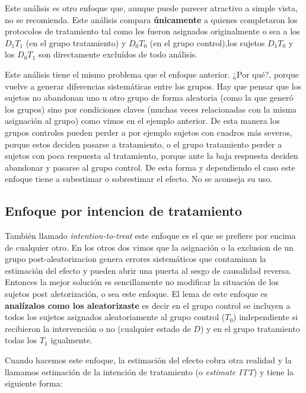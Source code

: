 \documentclass[
  letterpaper,
  DIV=11,
  numbers=noendperiod,
  oneside]{scrreprt}
\begin{document}
Este análisis es otro enfoque que, aunque puede parecer atractivo a
simple vista, no se recomienda. Este análisis compara
\textbf{únicamente} a quienes completaron los protocolos de tratamiento
tal como les fueron asignados originalmente o sea a los \(D_1 T_1\) (en
el grupo tratamiento) y \(D_0 T_0\) (en el grupo control),los sujetos
\(D_1 T_0\) y los \(D_0 T_1\) son directamente excluídos de todo
análisis.

Este análisis tiene el mismo problema que el enfoque anterior. ¿Por
qué?, porque vuelve a generar diferencias sistemáticas entre los grupos.
Hay que pensar que los sujetos no abandonan uno u otro grupo de forma
aleatoria (como la que generó los grupos) sino por condiciones claves
(muchas veces relacionadas con la misma asignación al grupo) como vimos
en el ejemplo anterior. De esta manera los grupos controles pueden
perder a por ejemplo sujetos con cuadros más severos, porque estos
deciden pasarse a tratamiento, o el grupo tratamiento perder a sujetos
con poca respuesta al tratamiento, porque ante la baja respuesta deciden
abandonar y pasarse al grupo control. De esta forma y dependiendo el
caso este enfoque tiene a subestimar o sobrestimar el efecto. No se
aconseja su uso.

\hypertarget{enfoque-por-intencion-de-tratamiento}{%
\subsection{\texorpdfstring{Enfoque por \textbf{intencion de
tratamiento}}{Enfoque por intencion de tratamiento}}\label{enfoque-por-intencion-de-tratamiento}}

También llamado \emph{intention-to-treat} este enfoque es el que se
prefiere por encima de cualquier otro. En los otros dos vimos que la
asignación o la exclusion de un grupo post-aleatorizacion genera errores
sistemáticos que contaminan la estimación del efecto y pueden abrir una
puerta al sesgo de causalidad reversa. Entonces la mejor solución es
sencillamente no modificar la situación de los sujetos post
aletorización, o sea este enfoque. El lema de este enfoque es
\textbf{analízalos como los aleatorizaste} es decir en el grupo control
se incluyen a todos los sujetos asignados aleatoriamente al grupo
control (\(T_0\)) independiente si recibieron la intervención o no
(cualquier estado de \(D\)) y en el grupo tratamiento todas los \(T_1\)
igualmente.

Cuando hacemos este enfoque, la estimación del efecto cobra otra
realidad y la llamamos estimación de la intención de tratamiento (o
\emph{estimate ITT}) y tiene la siguiente forma:
\end{document}
